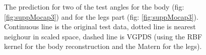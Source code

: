 \begin{figure}[ht]
\begin{center}
\end{center}
\caption{\small{
The prediction for two of the test angles for the body (fig: \ref{fig:suppMocap3}) and for the legs part (fig: \ref{fig:suppMocap3}). Continuous line is the original test data, dotted line is nearest neighour in scaled space, dashed line is VGPDS (using the RBF kernel for the body reconstruction and the Matern for the legs).
}
}
\label{fig:supplMocap2}
\end{figure}





